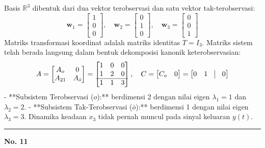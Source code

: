 \documentclass[11pt,a4paper]{article}
\begin{document}
Basis $\mathbb{R}^3$ dibentuk dari dua vektor terobservasi dan satu vektor tak-terobservasi:
$$\mathbf{w}_1 = \begin{bmatrix} 1 \\ 0 \\ 0 \end{bmatrix}, \quad \mathbf{w}_2 = \begin{bmatrix} 0 \\ 1 \\ 0 \end{bmatrix}, \quad \mathbf{w}_3 = \begin{bmatrix} 0 \\ 0 \\ 1 \end{bmatrix}$$
Matriks transformasi koordinat adalah matriks identitas $T = I_3$. Matriks sistem telah berada langsung dalam bentuk dekomposisi kanonik keterobservasian:
$$A = \begin{bmatrix} A_o & 0 \\ A_{21} & A_{\bar{o}} \end{bmatrix} = \begin{bmatrix} 1 & 0 & 0 \\ 1 & 2 & 0 \\ \hline 1 & 1 & 3 \end{bmatrix}, \quad C = \begin{bmatrix} C_o & 0 \end{bmatrix} = \begin{bmatrix} 0 & 1 & \vline & 0 \end{bmatrix}$$
- **Subsistem Terobservasi ($o$):** berdimensi 2 dengan nilai eigen $\lambda_1 = 1$ dan $\lambda_2 = 2$.
- **Subsistem Tak-Terobservasi ($\bar{o}$):** berdimensi 1 dengan nilai eigen $\lambda_3 = 3$. Dinamika keadaan $x_3$ tidak pernah muncul pada sinyal keluaran $y(t)$.

\vspace{12pt}
\hrule
\vspace{10pt}

\textbf{\large No. 11}
\end{document}
